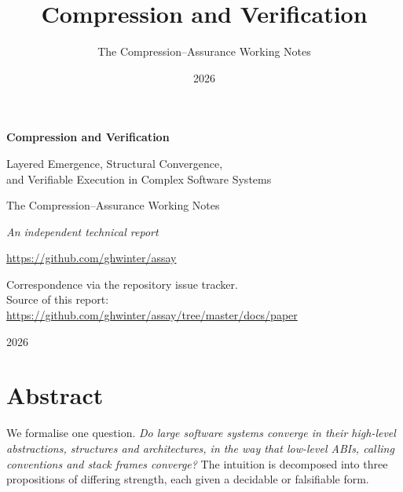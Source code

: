 \documentclass[11pt,a4paper,oneside,openany]{book}
\title{Compression and Verification}
\author{The Compression--Assurance Working Notes}
\date{2026}
\begin{document}
\frontmatter

\begin{titlepage}
\centering
\vspace*{2.6cm}
{\Huge\bfseries Compression and Verification\par}
\vspace{1.0cm}
{\LARGE Layered Emergence, Structural Convergence,\\[0.35em]
 and Verifiable Execution in Complex Software Systems\par}
\vspace{1.8cm}
{\large The Compression--Assurance Working Notes\par}
\vspace{0.45cm}
{\normalsize\itshape An independent technical report\par}
\vspace{0.7cm}
{\small\url{https://github.com/ghwinter/assay}\par}
\vspace{0.25cm}
{\footnotesize Correspondence via the repository issue tracker.\\
 Source of this report: \url{https://github.com/ghwinter/assay/tree/master/docs/paper}\par}
\vfill
{\normalsize 2026\par}
\vspace{1.0cm}
\end{titlepage}

\chapter*{Abstract}

We formalise one question. \emph{Do large software systems converge in their high-level
abstractions, structures and architectures, in the way that low-level ABIs, calling
conventions and stack frames converge?} The intuition is decomposed into three
propositions of differing strength, each given a decidable or falsifiable form.
\end{document}
